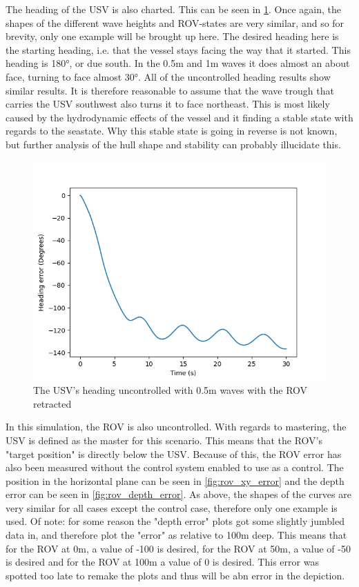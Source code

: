 \documentclass[class=article, crop=false]{standalone}
\begin{document}
The heading of the USV is also charted. This can be seen in \cref{fig:0.5m-heading-unc}. Once again, the shapes of the different wave heights and ROV-states are very similar, and so for brevity, only one example will be brought up here. The desired heading here is the starting heading, i.e. that the vessel stays facing the way that it started. This heading is 180°, or due south. In the 0.5m and 1m waves it does almost an about face, turning to face almost 30°. All of the uncontrolled heading results show similar results. It is therefore reasonable to assume that the wave trough that carries the USV southwest also turns it to face northeast. This is most likely caused by the hydrodynamic effects of the vessel and it finding a stable state with regards to the seastate. Why this stable state is going in reverse is not known, but further analysis of the hull shape and stability can probably illucidate this.

\begin{figure}
    \centering
    \includegraphics{scenario1/rov-0m/0.5m/usv_heading_error_uncontrolled}
    \caption{The USV's heading uncontrolled with 0.5m waves with the ROV retracted}
    \label{fig:0.5m-heading-unc}
\end{figure}

In this simulation, the ROV is also uncontrolled. With regards to mastering, the USV is defined as the master for this scenario. This means that the ROV's "target position" is directly below the USV. Because of this, the ROV error has also been measured without the control system enabled to use as a control. The position in the horizontal plane can be seen in \cref{fig:rov_xy_error} and the depth error can be seen in \cref{fig:rov_depth_error}. As above, the shapes of the curves are very similar for all cases except the control case, therefore only one example is used. Of note: for some reason the "depth error" plots got some slightly jumbled data in, and therefore plot the "error" as relative to 100m deep. This means that for the ROV at 0m, a value of -100 is desired, for the ROV at 50m, a value of -50 is desired and for the ROV at 100m a value of 0 is desired. This error was spotted too late to remake the plots and thus will be abn error in the depiction.
\end{document}
